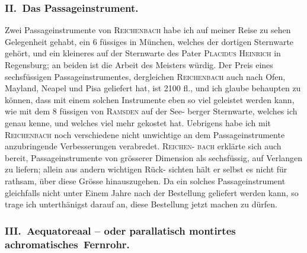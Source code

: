 \documentclass[12pt,a4paper]{article}
\theoremstyle{plain}
\theoremstyle{definition}
\theoremstyle{remark}
\begin{document}
\subsubsection*{II.\ Das Passageinstrument.}

Zwei Passageinstrumente von \textsc{Reichenbach} habe ich auf meiner Reise
zu sehen Gelegenheit gehabt, ein 6 f\"{u}ssiges in M\"{u}nchen, welches der dortigen
Sternwarte geh\"{o}rt, und ein kleineres auf der Sternwarte des Pater \textsc{Placidus
Heinrich} in Regensburg; an beiden ist die Arbeit des Meisters w\"{u}rdig. Der
Preis eines sechsf\"{u}ssigen Passageinstrumentes, dergleichen \textsc{Reichenbach} auch
nach Ofen, Mayland, Neapel und Pisa geliefert hat, ist 2100 fl., und ich
glaube behaupten zu k\"{o}nnen, dass mit einem solchen Instrumente eben so
viel geleistet werden kann, wie mit dem 8 f\"{u}ssigen von \textsc{Ramsden} auf der See-
berger Sternwarte, welches ich genau kenne, und welches viel mehr gekostet
hat. Uebrigens habe ich mit \textsc{Reichenbach} noch verschiedene nicht unwichtige an
dem Passageinstrumente anzubringende Verbesserungen verabredet. \textsc{Reichen}-
\textsc{bach} erkl\"{a}rte sich auch bereit, Passageinstrumente von gr\"{o}sserer Dimension
als sechsf\"{u}ssig, auf Verlangen zu liefern; allein aus andern wichtigen R\"{u}ck-
sichten h\"{a}lt er selbst es nicht f\"{u}r rathsam, \"{u}ber diese Gr\"{o}sse hinauszugehen.
Da ein solches Passageinstrument gleichfalls nicht unter Einem Jahre nach
der Bestellung geliefert werden kann, so trage ich unterth\"{a}nigst darauf an,
diese Bestellung jetzt machen zu d\"{u}rfen.

\subsubsection*{III.\ Aequatoreaal -- oder parallatisch montirtes achromatisches\ Fernrohr.}
\end{document}
